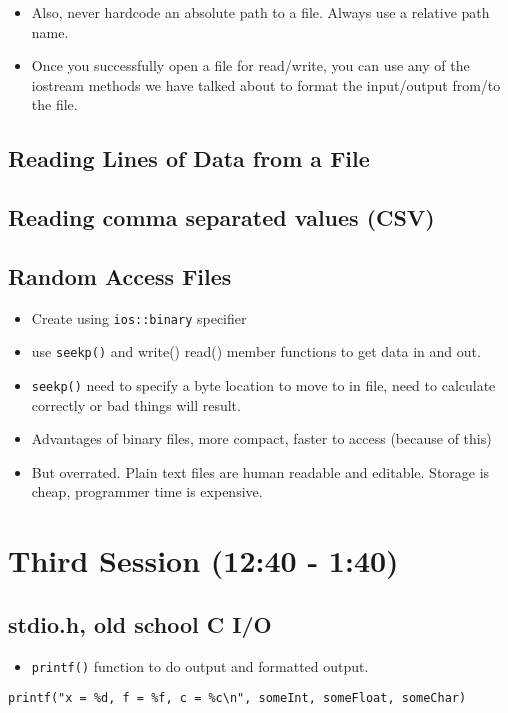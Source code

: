 \documentclass[11pt]{article}
\begin{document}
\begin{itemize}
\item Also, never hardcode an absolute path to a file.  Always use a relative path name.
\item Once you successfully open a file for read/write, you can use any of
the iostream methods we have talked about to format the input/output
from/to the file.
\end{itemize}
\subsection{Reading Lines of Data from a File}
\label{sec-2-4}
\subsection{Reading comma separated values (CSV)}
\label{sec-2-5}
\subsection{Random Access Files}
\label{sec-2-6}
\begin{itemize}
\item Create using \verb~ios::binary~ specifier
\item use \verb~seekp()~ and write() read() member functions to get data in and out.
\item \verb~seekp()~ need to specify a byte location to move to in file, need to
calculate correctly or bad things will result.
\item Advantages of binary files, more compact, faster to access (because of this)
\item But overrated.  Plain text files are human readable and editable.
Storage is cheap, programmer time is expensive.
\end{itemize}
\section{Third Session (12:40 - 1:40)}
\label{sec-3}

\subsection{stdio.h, old school C I/O}
\label{sec-3-1}
\begin{itemize}
\item \verb~printf()~ function to do output and formatted output.
\end{itemize}

\begin{verbatim}
printf("x = %d, f = %f, c = %c\n", someInt, someFloat, someChar)
\end{verbatim}
\end{document}
